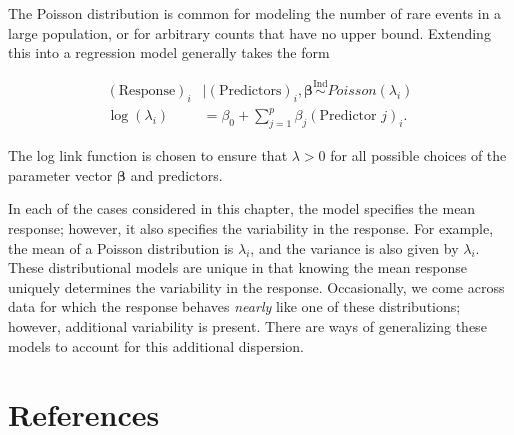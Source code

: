 \documentclass[
  letterpaper,
  DIV=11,
  numbers=noendperiod]{scrreprt}
\theoremstyle{definition}
\theoremstyle{plain}
\theoremstyle{definition}
\theoremstyle{remark}
\begin{document}
The Poisson distribution is common for modeling the number of rare
events in a large population, or for arbitrary counts that have no upper
bound. Extending this into a regression model generally takes the form

\[
\begin{aligned}
  (\text{Response})_i &\mid (\text{Predictors})_i, \boldsymbol{\beta} \stackrel{\text{Ind}}{\sim}Poisson\left(\lambda_i\right) \\
  \log\left(\lambda_i\right) &= \beta_0 + \sum_{j=1}^{p} \beta_j (\text{Predictor } j)_i.
\end{aligned}
\]

The log link function is chosen to ensure that \(\lambda > 0\) for all
possible choices of the parameter vector \(\boldsymbol{\beta}\) and
predictors.

In each of the cases considered in this chapter, the model specifies the
mean response; however, it also specifies the variability in the
response. For example, the mean of a Poisson distribution is
\(\lambda_i\), and the variance is also given by \(\lambda_i\). These
distributional models are unique in that knowing the mean response
uniquely determines the variability in the response. Occasionally, we
come across data for which the response behaves \emph{nearly} like one
of these distributions; however, additional variability is present.
There are ways of generalizing these models to account for this
additional dispersion.


\hypertarget{references}{%
\chapter*{References}\label{references}}

\end{document}

